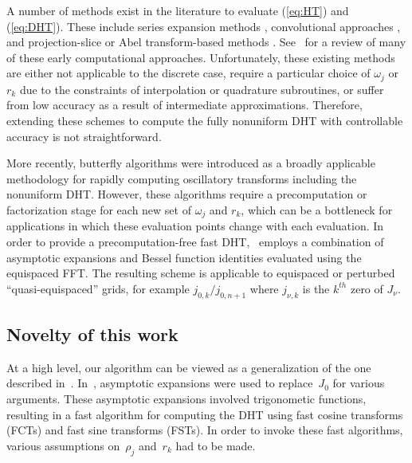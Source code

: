 A number of methods exist in the literature to evaluate (\ref{eq:HT}) and
(\ref{eq:DHT}). These include series expansion methods
\cite{lord1954b,brunol1977fourier,cavanagh1979numerical}, convolutional
approaches \cite{siegman1977quasi, johansen1979fast, mook1983algorithm,
liu1999nonuniform}, and projection-slice or Abel transform-based methods
\cite{oppenheim1980computation, hansen1985fast, kapur1995algorithm}.
See~\cite{cree1993algorithms} for a review of many of these early computational
approaches. Unfortunately, these existing methods are either not applicable to
the discrete case, require a particular choice of $\omega_j$ or $r_k$ due to the
constraints of interpolation or quadrature subroutines, or suffer from low
accuracy as a result of intermediate approximations. Therefore, extending these
schemes to compute the fully nonuniform DHT with controllable accuracy is not
straightforward.

More recently, butterfly algorithms \cite{oneil2010algorithm, li2015butterfly,
pang2020interpolative} were introduced as a broadly applicable methodology for
rapidly computing oscillatory transforms including the nonuniform DHT. However,
these algorithms require a precomputation or factorization stage for each new
set of $\omega_j$ and $r_k$, which can be a bottleneck for applications in which
these evaluation points change with each evaluation. In order to provide a
precomputation-free fast DHT,~\cite{townsend2015fast} employs a combination of
asymptotic expansions and Bessel function identities evaluated using the
equispaced FFT. The resulting scheme is applicable to equispaced or perturbed
``quasi-equispaced'' grids, for example $j_{0,k} / j_{0,n+1}$ where $j_{\nu,k}$
is the $k^{th}$ zero of $J_\nu$.

\subsection*{Novelty of this work}

At a high level, our algorithm can be viewed as a generalization of the one
described in~\cite{townsend2015fast}. In~\cite{townsend2015fast}, asymptotic
expansions were used to replace~$J_0$ for various arguments. These asymptotic
expansions involved trigonometic functions, resulting in a fast algorithm for
computing the DHT using fast cosine transforms (FCTs) and fast sine transforms
(FSTs). In order to invoke these fast algorithms, various assumptions
on~$\rho_j$ and~$r_k$ had to be made.

